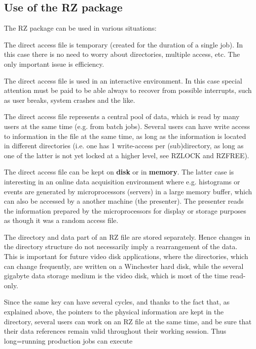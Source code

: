 \subsection{Use of the RZ package}
The RZ package can be used in various situations:
\begin{OL}
\item The direct access file is temporary (created for the
duration of a single job). In this case there is no need to worry about
directories, multiple access, etc. The only important issue is efficiency.
\item
The direct access file is used in an interactive environment. In this
case special attention must be paid to be able always to recover from
possible interrupts, such as user breaks, system crashes and the like.
\item
The direct access file represents a central pool of data, which
is read by many users at the same time (e.g. from batch jobs).
Several users can have write access to information in the file at the
same time, as long as the information is located in different
directories (i.e. one has 1 write-access per (sub)directory, as
long as one of the latter is not yet locked at a higher level, see
RZLOCK and RZFREE).
\end{OL}
\par The direct access file can be kept on {\bf disk} or in
{\bf memory}.
The latter case is interesting in an online data acquisition environment
where e.g. histograms or events are generated by microprocessors
(servers) in a large memory buffer, which can also be accessed by a
another machine (the presenter).
The presenter reads the information prepared by the
microprocessors for display or storage purposes as though it was
a random access file.
\par The directory and data part of an RZ file are stored separately. Hence
changes in the directory structure do not necessarily
imply a rearrangement of the data. This is important for future
video disk applications, where the directories, which can change
frequently, are written on a Winchester hard disk, while the several
gigabyte data storage medium is the video disk, which is most of the time
read-only.
\par Since the same key can have several cycles, and thanks to the fact
that, as explained above, the pointers to the physical information are
kept in the directory, several users can work on an RZ file at the same
time, and be sure that their data references remain valid throughout
their working session. Thus long=running production jobs can execute
